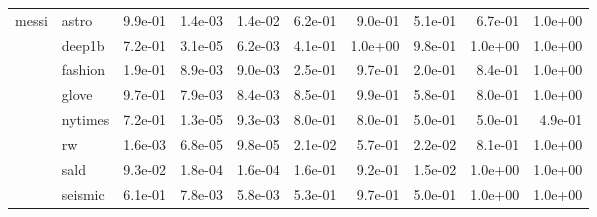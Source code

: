 \begin{tabular}{llrrrrrrrr}
\cline{1-10}
\multirow[t]{8}{*}{messi} & astro & 9.9e-01 & 1.4e-03 & 1.4e-02 & 6.2e-01 & 9.0e-01 & 5.1e-01 & 6.7e-01 & 1.0e+00 \\
 & deep1b & 7.2e-01 & 3.1e-05 & 6.2e-03 & 4.1e-01 & 1.0e+00 & 9.8e-01 & 1.0e+00 & 1.0e+00 \\
 & fashion & 1.9e-01 & 8.9e-03 & 9.0e-03 & 2.5e-01 & 9.7e-01 & 2.0e-01 & 8.4e-01 & 1.0e+00 \\
 & glove & 9.7e-01 & 7.9e-03 & 8.4e-03 & 8.5e-01 & 9.9e-01 & 5.8e-01 & 8.0e-01 & 1.0e+00 \\
 & nytimes & 7.2e-01 & 1.3e-05 & 9.3e-03 & 8.0e-01 & 8.0e-01 & 5.0e-01 & 5.0e-01 & 4.9e-01 \\
 & rw & 1.6e-03 & 6.8e-05 & 9.8e-05 & 2.1e-02 & 5.7e-01 & 2.2e-02 & 8.1e-01 & 1.0e+00 \\
 & sald & 9.3e-02 & 1.8e-04 & 1.6e-04 & 1.6e-01 & 9.2e-01 & 1.5e-02 & 1.0e+00 & 1.0e+00 \\
 & seismic & 6.1e-01 & 7.8e-03 & 5.8e-03 & 5.3e-01 & 9.7e-01 & 5.0e-01 & 1.0e+00 & 1.0e+00 \\
\cline{1-10}
\bottomrule
\end{tabular}

